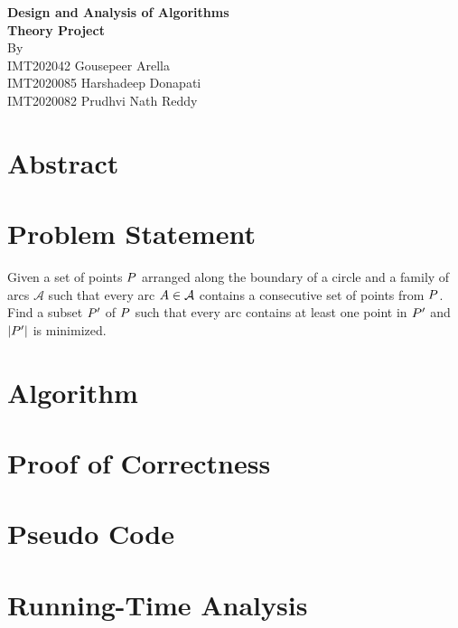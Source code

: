 \documentclass[11pt]{article}
\begin{document}
\begin{titlepage}
\begin{center}
\vspace*{0.5cm}
\Large{\textbf{Design and Analysis of Algorithms}}\\
\Large{\textbf{Theory Project}}\\
\vfill
\vfill
By \\ 
IMT202042 Gousepeer Arella \\
IMT2020085 Harshadeep Donapati \\
IMT2020082 Prudhvi Nath Reddy \\
\end{center}
\end{titlepage}

\tableofcontents
\thispagestyle{empty}
\clearpage
\setcounter{page}{1}

\section{Abstract}

\section{Problem Statement}
Given a set of points $\mathnormal{P}$ arranged along the boundary of a circle and a
family of arcs $\mathcal{A}$ such that every arc $\mathnormal{A} \in \mathcal{A}$ contains a consecutive set of points from $\mathnormal{P}$. Find a subset $\mathnormal{P'}$ of $\mathnormal{P}$ such that every arc contains at least one point in $\mathnormal{P'}$ and $\abs{\mathnormal{P'}}$ is minimized.


\section{Algorithm}

\section{Proof of Correctness}



\section{Pseudo Code}


\section{Running-Time Analysis}


\pagebreak 
\begin{thebibliography}{}
\end{thebibliography}
\end{document}
